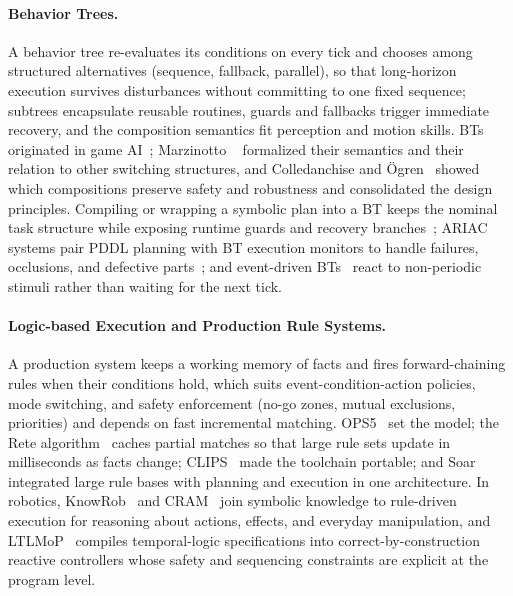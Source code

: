 \paragraph{Behavior Trees.}
A behavior tree re-evaluates its conditions on every tick and chooses among structured alternatives (sequence, fallback, parallel), so that long-horizon execution survives disturbances without committing to one fixed sequence; subtrees encapsulate reusable routines, guards and fallbacks trigger immediate recovery, and the composition semantics fit perception and motion skills. BTs originated in game AI~\cite{Isla2005Halo2}; Marzinotto \etal~\cite{Marzinotto2014BT} formalized their semantics and their relation to other switching structures, and Colledanchise and {\"O}gren~\cite{Colledanchise2017BT,Colledanchise2018BTbook} showed which compositions preserve safety and robustness and consolidated the design principles. Compiling or wrapping a symbolic plan into a BT keeps the nominal task structure while exposing runtime guards and recovery branches~\cite{mart2021behaviourtree}; ARIAC systems pair PDDL planning with BT execution monitors to handle failures, occlusions, and defective parts~\cite{liu2024autonomous}; and event-driven BTs~\cite{Agis2020EDBT} react to non-periodic stimuli rather than waiting for the next tick.

\paragraph{Logic-based Execution and Production Rule Systems.}
A production system keeps a working memory of facts and fires forward-chaining rules when their conditions hold, which suits event-condition-action policies, mode switching, and safety enforcement (no-go zones, mutual exclusions, priorities) and depends on fast incremental matching. OPS5~\cite{Forgy1981OPS5} set the model; the Rete algorithm~\cite{Forgy1982Rete} caches partial matches so that large rule sets update in milliseconds as facts change; CLIPS~\cite{Riley1991CLIPS} made the toolchain portable; and Soar~\cite{Laird1987Soar} integrated large rule bases with planning and execution in one architecture. In robotics, KnowRob~\cite{tenorth2013knowrob} and CRAM~\cite{beetz2010cram,beetz2023cram} join symbolic knowledge to rule-driven execution for reasoning about actions, effects, and everyday manipulation, and LTLMoP~\cite{finucane2010ltlmop} compiles temporal-logic specifications into correct-by-construction reactive controllers whose safety and sequencing constraints are explicit at the program level.

